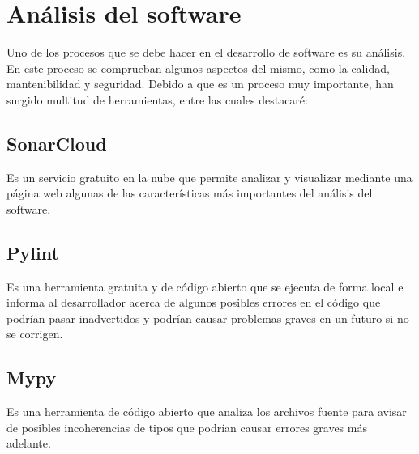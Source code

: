 \section{Análisis del software}
Uno de los procesos que se debe hacer en el desarrollo de software es su análisis. En este proceso se comprueban algunos aspectos del mismo, como la calidad, mantenibilidad y seguridad. Debido a que es un proceso muy importante, han surgido multitud de herramientas, entre las cuales destacaré:
\subsection{SonarCloud}
Es un servicio gratuito en la nube que permite analizar y visualizar mediante una página web algunas de las características más importantes del análisis del software.
\subsection{Pylint}
Es una herramienta gratuita y de código abierto que se ejecuta de forma local e informa al desarrollador acerca de algunos posibles errores en el código que podrían pasar inadvertidos y podrían causar problemas graves en un futuro si no se corrigen.
\subsection{Mypy}
Es una herramienta de código abierto que analiza los archivos fuente para avisar de posibles incoherencias de tipos que podrían causar errores graves más adelante.